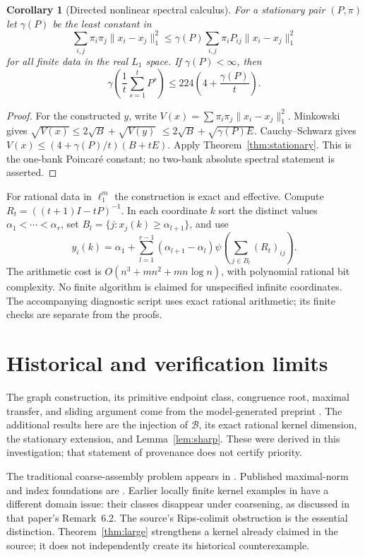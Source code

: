 \documentclass[11pt]{article}
\newtheorem{corollary}[theorem]{Corollary}
\theoremstyle{remark}\newtheorem{remark}[theorem]{Remark}
\begin{document}
\begin{corollary}[Directed nonlinear spectral calculus]
For a stationary pair $(P,\pi)$ let $\gamma(P)$ be the least constant in
\[
 \sum_{i,j}\pi_i\pi_j\|x_i-x_j\|_1^2
 \leq\gamma(P)\sum_{i,j}\pi_iP_{ij}\|x_i-x_j\|_1^2
\]
for all finite data in the real $L_1$ space. If $\gamma(P)<\infty$, then
\[
 \gamma\left(\frac1t\sum_{s=1}^tP^s\right)
 \leq224\left(4+\frac{\gamma(P)}t\right).
\]
\end{corollary}
\begin{proof}
For the constructed $y$, write $V(x)=\sum\pi_i\pi_j\|x_i-x_j\|_1^2$.
Minkowski gives $\sqrt{V(x)}\leq2\sqrt B+\sqrt{V(y)}$
$\leq2\sqrt B+\sqrt{\gamma(P)E}$.
Cauchy--Schwarz gives $V(x)\leq(4+\gamma(P)/t)(B+tE)$.
Apply Theorem~\ref{thm:stationary}. This is the one-bank Poincar\'e constant;
no two-bank absolute spectral statement is asserted.
\end{proof}

For rational data in $\ell_1^m$ the construction is exact and effective.
Compute $R_t=((t+1)I-tP)^{-1}$. In each coordinate $k$ sort the distinct
values $\alpha_1<\cdots<\alpha_r$, set
$B_l=\{j:x_j(k)\geq\alpha_{l+1}\}$, and use
\[
 y_i(k)=\alpha_1+\sum_{l=1}^{r-1}(\alpha_{l+1}-\alpha_l)
                   \psi\left(\sum_{j\in B_l}(R_t)_{ij}\right).
\]
The arithmetic cost is $O(n^3+mn^2+mn\log n)$, with polynomial rational
bit complexity. No finite algorithm is claimed for unspecified infinite
coordinates. The accompanying diagnostic script uses exact rational
arithmetic; its finite checks are separate from the proofs.

\section{Historical and verification limits}

The graph construction, its primitive endpoint class, congruence root,
maximal transfer, and sliding argument come from the model-generated
preprint \cite{OAIcoarse}. The additional results here are the injection
of $\mathcal B$, its exact rational kernel dimension, the stationary
extension, and Lemma~\ref{lem:sharp}. These were derived in this investigation;
that statement of provenance does not certify priority.

The traditional coarse-assembly problem appears in \cite{HR}.
Published maximal-norm and index foundations are \cite{OOY,SS}.
Earlier locally finite kernel examples in \cite{DFW} have a different
domain issue: their classes disappear under coarsening, as discussed in
that paper's Remark~6.2. The source's Rips-colimit obstruction is the
essential distinction. Theorem~\ref{thm:large} strengthens a kernel
already claimed in the source; it does not independently create its
historical counterexample.
\end{document}
